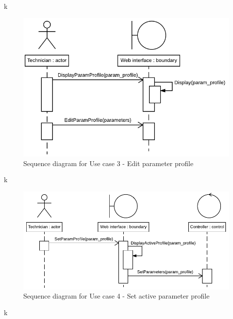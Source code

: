 k

\begin{figure}[H]
	\centering
	\includegraphics[width=1\linewidth]{Images/System_architecture/Use_case_3_SD}
	\caption{Sequence diagram for Use case 3 - Edit parameter profile}
\end{figure}

k

\begin{figure}[H]
	\centering
	\includegraphics[width=1\linewidth]{Images/System_architecture/Use_case_4_SD}
	\caption{Sequence diagram for Use case 4 - Set active parameter profile}
\end{figure}

k

